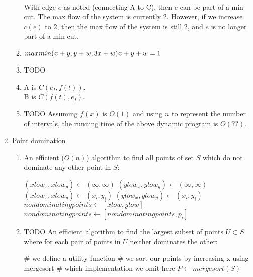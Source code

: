 \documentclass[a4paper]{article}
\begin{document}
\begin{enumerate}
\begin{enumerate}
\\
		With edge $e$ as noted (connecting A to C), then $e$ can be part of a min cut.  The max flow of the system is currently 2.  However, if we increase $c(e)$ to 2, then the max flow of the system is still 2, and $e$ is no longer part of a min cut.
	\item $max min(x+y,y+w,3x+w)\\x+y+w=1$
	\item TODO
	\item A is $C(e_I , f(t))$.\\B is $C(f(t), e_I)$.
	\item TODO Assuming $f(x)$ is $O(1)$ and using $n$ to represent the number of intervals, the running time of the above dynamic program is $O(??)$.
	\end{enumerate}
\item Point domination
	\begin{enumerate}
	\item An efficient ($O(n)$) algorithm to find all points of set $S$ which do not dominate any other point in $S$:
		\begin{algorithmic}
		\State $(xlow_x, xlow_y) \gets (\infty, \infty)$
		\State $(ylow_x, ylow_y) \gets (\infty, \infty)$
				\State $(xlow_x, xlow_y) \gets (x_i , y_i )$
			\EndIf
				\State $(ylow_x, ylow_y) \gets (x_i , y_i )$
			\EndIf
		\EndFor
		\State $nondominatingpoints \gets [xlow , ylow]$
				\State $nondominatingpoints \gets [nondominatingpoints, p_i]$
			\EndIf
		\EndFor
		\end{algorithmic}
	\item TODO An efficient algorithm to find the largest subset of points $U \subset S$ where for each pair of points in $U$ neither dominates the other:
		\begin{algorithmic}
		\State \# we define a utility function
		\Function{ylessthan}{$p_i = (x_i , y_i ) , p_j = (x_j , y_j )$}
			\If{$y_i < y_j$}
				\Return 1
			\Else{}
				\Return 0
			\EndIf
		\EndFunction
		\State \# we sort our points by increasing x using mergesort
		\State \# which implementation we omit here
		\State $P \gets mergesort(S)$

\end{algorithmic}
\end{enumerate}
\end{enumerate}
\end{document}
